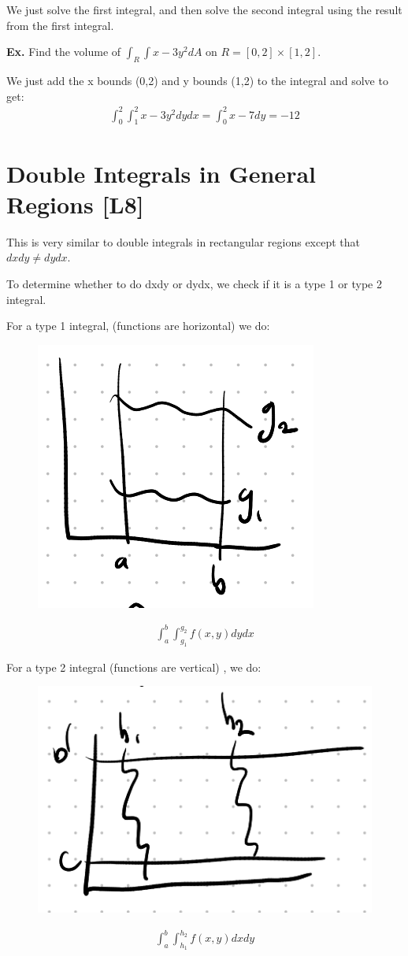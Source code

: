 \documentclass[12pt,letterpaper]{article} \usepackage{amsmath} \usepackage{graphicx} \usepackage[margin=1in]{geometry} \usepackage{longtable}  \usepackage{amssymb}
\begin{document}
	We just solve the first integral, and then solve the second integral using the result from the first integral.
	\begin{mdframed}[]
		\textbf{Ex. } Find the volume of $\int_R \int x-3y^2 dA$ on $R=[0,2]\times [1,2]$.
		
		We just add the x bounds (0,2) and y bounds (1,2) to the integral and solve to get:
		\begin{align*}
			\int^2_0 \int_1^2 x-3y^2 dydx = \int_0^2 x-7 dy = -12
		\end{align*}
	\end{mdframed}
	
	\section{Double Integrals in General Regions [L8]}
	This is very similar to double integrals in rectangular regions except that $dxdy \ne dydx$.
	
	To determine whether to do dxdy or dydx, we check if it is a type 1 or type 2 integral.
	
	For a type 1 integral, (functions are horizontal) we do:
	\begin{figure}[H]
		\centering
		\includegraphics[width=0.3\linewidth]{type1.png}
	\end{figure}
	\begin{align*}
		\int_a^b \int^{g_2}_{g_1} f(x,y) dydx
	\end{align*}

	For a type 2 integral (functions are vertical) , we do:
	\begin{figure}[H]
		\centering
		\includegraphics[width=0.3\linewidth]{type2.png}
	\end{figure}
	\begin{align*}
		\int_a^b \int_{h_1}^{h_2} f(x,y) dxdy
	\end{align*}
	
\end{document}
